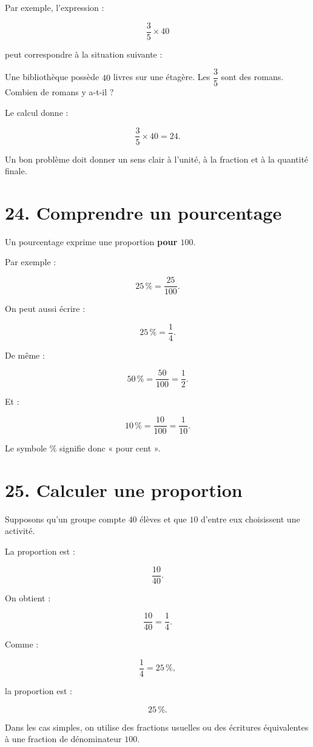 Par exemple, l’expression :

\[
\dfrac{3}{5}\times40
\]

peut correspondre à la situation suivante :

\begin{remarque}
Une bibliothèque possède $40$ livres sur une étagère. Les $\dfrac{3}{5}$ sont des romans. Combien de romans y a-t-il ?
\end{remarque}

Le calcul donne :

\[
\dfrac{3}{5}\times40
=
24.
\]

Un bon problème doit donner un sens clair à l’unité, à la fraction et à la quantité finale.

\section{24. Comprendre un pourcentage}

Un pourcentage exprime une proportion \textbf{pour $100$}.

Par exemple :

\[
25\,\%
=
\dfrac{25}{100}.
\]

On peut aussi écrire :

\[
25\,\%
=
\dfrac{1}{4}.
\]

De même :

\[
50\,\%
=
\dfrac{50}{100}
=
\dfrac{1}{2}.
\]

Et :

\[
10\,\%
=
\dfrac{10}{100}
=
\dfrac{1}{10}.
\]

Le symbole $\%$ signifie donc « pour cent ».

\section{25. Calculer une proportion}

Supposons qu’un groupe compte $40$ élèves et que $10$ d’entre eux choisissent une activité.

La proportion est :

\[
\dfrac{10}{40}.
\]

On obtient :

\[
\dfrac{10}{40}
=
\dfrac{1}{4}.
\]

Comme :

\[
\dfrac{1}{4}
=
25\,\%,
\]

la proportion est :

\[
\boxed{25\,\%}.
\]

Dans les cas simples, on utilise des fractions usuelles ou des écritures équivalentes à une fraction de dénominateur $100$.

